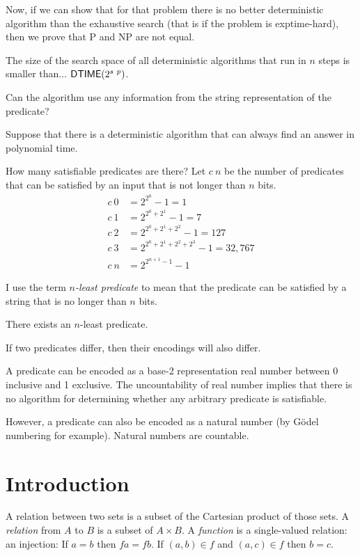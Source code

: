 Now, if we can show that for that problem
there is no better deterministic algorithm than the exhaustive search
(that is if the problem is exptime-hard),
then we prove that P and NP are not equal.

The size of the search space of all deterministic algorithms
that run in $n$ steps is smaller than...
$\operatorname{\mathsf{DTIME}}(2^{s~p})$.

Can the algorithm use any information from
the string representation of the predicate?

Suppose that there is a deterministic algorithm that can
always find an answer in polynomial time.

How many satisfiable predicates are there?
Let $c~n$ be the number of predicates that can be satisfied
by an input that is not longer than $n$ bits.
\begin{align}
  c~0 &= 2^{2^0} - 1 = 1
  \\
  c~1 &= 2^{2^0 + 2^1} - 1 = 7
  \\
  c~2 &= 2^{2^0 + 2^1 + 2^2} - 1 = 127
  \\
  c~3 &= 2^{2^0 + 2^1 + 2^2 + 2^3} - 1 = 32,767
  \\
  c~n &= 2^{2^{n+1}-1} - 1
\end{align}

I use the term \emph{$n$-least predicate} to mean that the predicate
can be satisfied by a string that is no longer than $n$ bits.

There exists an $n$-least predicate.

If two predicates differ, then their encodings will also differ.

A predicate can be encoded as a base-2 representation real number
between 0 inclusive and 1 exclusive.
The uncountability of real number implies that there is no algorithm
for determining whether any arbitrary predicate is satisfiable.

However, a predicate can also be encoded as a natural number
(by G\"odel numbering for example).
Natural numbers are countable.

\section{Introduction}

A relation between two sets is a subset of the Cartesian product of those sets.
A \emph{relation} from $A$ to $B$ is a subset of $A \times B$.
A \emph{function} is a single-valued relation:
an injection:
If $a = b$ then $f a = f b$.
If $(a,b) \in f$ and $(a,c) \in f$ then $b = c$.

